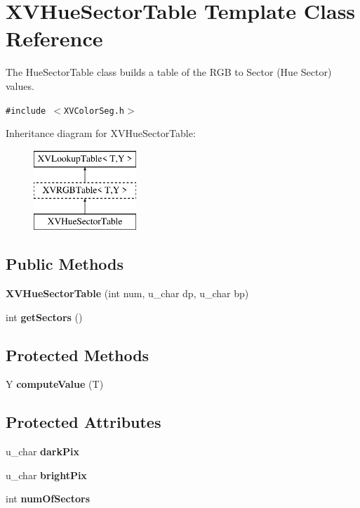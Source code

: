 \hypertarget{class_XVHueSectorTable}{
\section{XVHue\-Sector\-Table  Template Class Reference}
\label{XVHueSectorTable}
}
The Hue\-Sector\-Table class builds a table of the RGB to Sector (Hue Sector) values. 


{\tt \#include $<$XVColor\-Seg.h$>$}

Inheritance diagram for XVHue\-Sector\-Table:\begin{figure}[H]
\begin{center}
\leavevmode
\includegraphics[height=3cm]{class_XVHueSectorTable}
\end{center}
\end{figure}
\subsection*{Public Methods}
\begin{CompactItemize}
\item 
{\bf XVHue\-Sector\-Table} (int num, u\_\-char dp, u\_\-char bp)
\item 
int {\bf get\-Sectors} ()
\end{CompactItemize}
\subsection*{Protected Methods}
\begin{CompactItemize}
\item 
\label{XVHueSectorTable_b0}
\hypertarget{class_XVHueSectorTable_b0}{
Y {\bf compute\-Value} (T)}

\end{CompactItemize}
\subsection*{Protected Attributes}
\begin{CompactItemize}
\item 
u\_\-char {\bf dark\-Pix}
\item 
u\_\-char {\bf bright\-Pix}
\item 
int {\bf num\-Of\-Sectors}
\end{CompactItemize}


